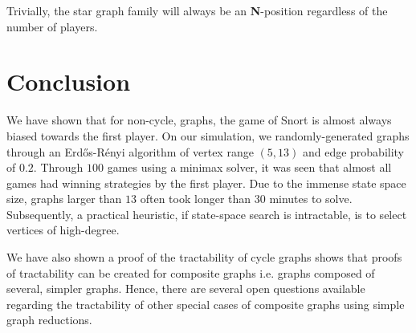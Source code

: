 \documentclass{sig-alternate}
\newcommand\npos[0]{\textbf{N}}
\begin{document}
Trivially, the star graph family will always be an \npos-position regardless of
the number of players.

\section{Conclusion}

We have shown that for non-cycle, graphs, the game of Snort is almost always
biased towards the first player. On our simulation, we randomly-generated
graphs through an Erd\H{o}s-R\'{e}nyi algorithm of vertex range $(5, 13)$ and
edge probability of $0.2$. Through $100$ games using a minimax solver, it was
seen that almost all games had winning strategies by the first player. Due to
the immense state space size, graphs larger than $13$ often took longer than 30
minutes to solve.  Subsequently, a practical heuristic, if state-space search
is intractable, is to select vertices of high-degree. 

We have also shown a proof of the tractability of cycle graphs shows that
proofs of tractability can be created for composite graphs i.e.  graphs
composed of several, simpler graphs. Hence, there are several open questions
available regarding the tractability of other special cases of composite graphs
using simple graph reductions.



\end{document}
